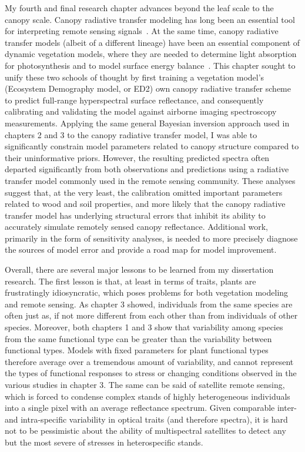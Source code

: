 My fourth and final research chapter advances beyond the leaf scale to the canopy scale.
Canopy radiative transfer modeling has long been an essential tool for interpreting remote sensing signals~\cite{verhoef_1984_sail,jacquemoud_2009_prosail}.
At the same time, canopy radiative transfer models (albeit of a different lineage) have been an essential component of dynamic vegetation models, where they are needed to determine light absorption for photosynthesis and to model surface energy balance~\cite{dickinson_1983_land,SELLERS_1985_canopy,clm45_note}.
This chapter sought to unify these two schools of thought by first training a vegetation model's (Ecosystem Demography model, or ED2) own canopy radiative transfer scheme to predict full-range hyperspectral surface reflectance, and consequently calibrating and validating the model against airborne imaging spectroscopy measurements.
Applying the same general Bayesian inversion approach used in chapters 2 and 3 to the canopy radiative transfer model, I was able to significantly constrain model parameters related to canopy structure compared to their uninformative priors.
However, the resulting predicted spectra often departed significantly from both observations and predictions using a radiative transfer model commonly used in the remote sensing community.
These analyses suggest that, at the very least, the calibration omitted important parameters related to wood and soil properties, and more likely that the canopy radiative transfer model has underlying structural errors that inhibit its ability to accurately simulate remotely sensed canopy reflectance.
Additional work, primarily in the form of sensitivity analyses, is needed to more precisely diagnose the sources of model error and provide a road map for model improvement.

Overall, there are several major lessons to be learned from my dissertation research.
The first lesson is that, at least in terms of traits, plants are frustratingly idiosyncratic, which poses problems for both vegetation modeling and remote sensing.
As chapter 3 showed, individuals from the same species are often just as, if not more different from each other than from individuals of other species.
Moreover, both chapters 1 and 3 show that variability among species from the same functional type can be greater than the variability between functional types.
Models with fixed parameters for plant functional types therefore average over a tremendous amount of variability, and cannot represent the types of functional responses to stress or changing conditions observed in the various studies in chapter 3.
The same can be said of satellite remote sensing, which is forced to condense complex stands of highly heterogeneous individuals into a single pixel with an average reflectance spectrum.
Given comparable inter- and intra-specific variability in optical traits (and therefore spectra), it is hard not to be pessimistic about the ability of multispectral satellites to detect any but the most severe of stresses in heterospecific stands.

